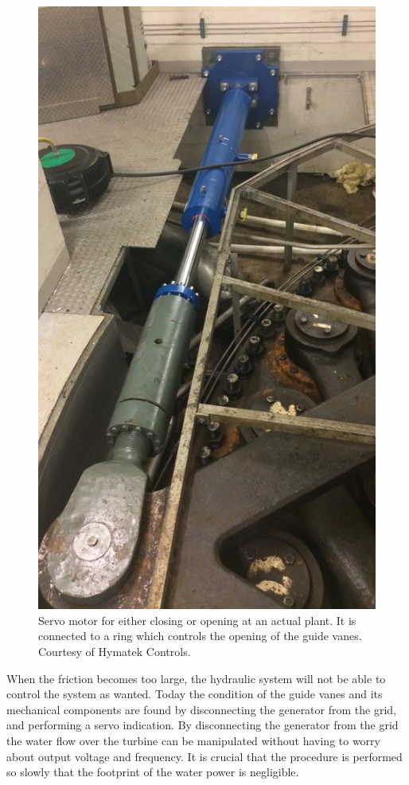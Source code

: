         \begin{figure}
            \centering    
            \includegraphics[scale = 0.5]{figures/introduction/servo1.jpg}
            \caption{Servo motor for either closing or opening at an actual plant. It is connected to a ring which controls the opening of the guide vanes. Courtesy of Hymatek Controls.}
            \label{fig:servo_plant}
        \end{figure}
        When the friction becomes too large, the hydraulic system will not be able to control the system as wanted. Today the condition of the guide vanes and its mechanical components are found by disconnecting the generator from the grid, and performing a servo indication. By disconnecting the generator from the grid the water flow over the turbine can be manipulated without having to worry about output voltage and frequency. It is crucial that the procedure is performed so slowly that the footprint of the water power is negligible. 
        
